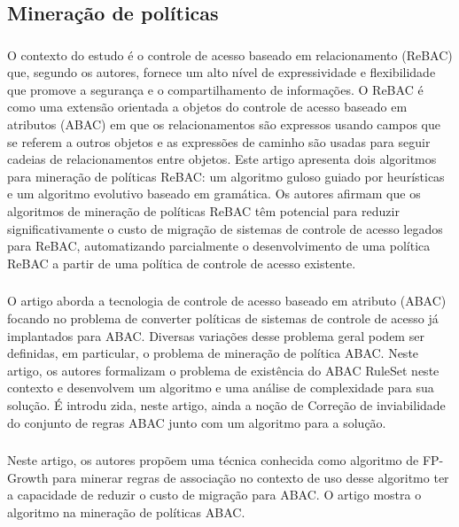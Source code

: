 \subsection{Mineração de políticas}\label{sec:mineracao-politicas}
\subsubsection{  }
O contexto do estudo é o controle de acesso baseado em relacionamento (ReBAC) que, segundo os autores, fornece um alto nível de expressividade e flexibilidade que promove a segurança e o compartilhamento de informações. O ReBAC é como uma extensão orientada a objetos do controle de acesso baseado em atributos (ABAC) em que os relacionamentos são expressos usando campos que se referem a outros objetos e as expressões de caminho são usadas para seguir cadeias de relacionamentos entre objetos. Este artigo apresenta dois algoritmos para mineração de políticas ReBAC: um algoritmo guloso guiado por heurísticas e um algoritmo evolutivo baseado em gramática. Os autores afirmam que os algoritmos de mineração de políticas ReBAC têm potencial para reduzir significativamente o custo de migração de sistemas de controle de acesso legados para ReBAC, automatizando parcialmente o desenvolvimento de uma política ReBAC a partir de uma política de controle de acesso existente.

\subsubsection{}
O artigo aborda a tecnologia de controle de acesso baseado em atributo (ABAC) focando no problema de converter políticas de sistemas de controle de acesso já implantados para ABAC. Diversas variações desse problema geral podem ser definidas, em particular, o problema de mineração de política ABAC. Neste artigo, os autores formalizam o problema de existência do ABAC RuleSet neste contexto e desenvolvem um algoritmo e uma análise de complexidade para sua solução. É introdu zida, neste artigo, ainda a noção de Correção de inviabilidade do conjunto de regras ABAC junto com um algoritmo para a solução.

\subsubsection{ }
Neste artigo, os autores propõem uma técnica conhecida como algoritmo de FP-Growth para minerar regras de associação no contexto de uso desse algoritmo ter a capacidade de reduzir o custo de migração para ABAC. O artigo mostra o algoritmo na mineração de políticas ABAC. 

